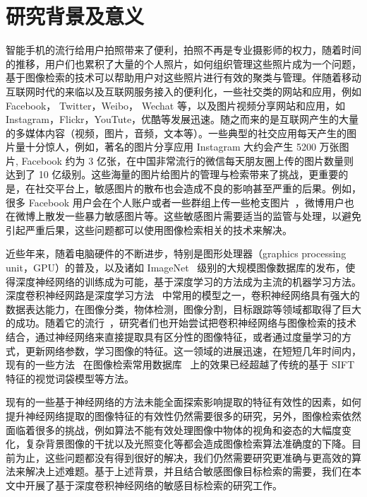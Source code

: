 \section{研究背景及意义}
智能手机的流行给用户拍照带来了便利，拍照不再是专业摄影师的权力，随着时间的推移，用户们也累积了大量的个人照片，如何组织管理这些照片成为一个问题，基于图像检索的技术可以帮助用户对这些照片进行有效的聚类与管理。伴随着移动互联网时代的来临以及互联网服务接入的便利化，一些社交类的网站和应用，例如 Facebook， Twitter，Weibo， Wechat 等，以及图片视频分享网站和应用，如 Instagram，Flickr，YouTute，优酷等发展迅速。随之而来的是互联网产生的大量的多媒体内容（视频，图片，音频，文本等）。一些典型的社交应用每天产生的图片量十分惊人，例如，著名的图片分享应用 Instagram 大约会产生 5200 万张图片, Facebook 约为 3 亿张，在中国非常流行的微信每天朋友圈上传的图片数量则达到了 10 亿级别。这些海量的图片给图片的管理与检索带来了挑战，更重要的是，在社交平台上，敏感图片的散布也会造成不良的影响甚至严重的后果。例如，很多 Facebook 用户会在个人账户或者一些群组上传一些枪支图片~\cite{Drange2016,MELE2016FacebookBG}，微博用户也在微博上散发一些暴力敏感图片等。这些敏感图片需要适当的监管与处理，以避免引起严重后果，这些问题都可以使用图像检索相关的技术来解决。

近些年来，随着电脑硬件的不断进步，特别是图形处理器（graphics processing unit，GPU）的普及，以及诸如 ImageNet~\cite{Russakovsky2015ImageNetLS} 级别的大规模图像数据库的发布，使得深度神经网络的训练成为可能，基于深度学习的方法成为主流的机器学习方法。深度卷积神经网路是深度学习方法~\cite{lecun2015deep} 中常用的模型之一，卷积神经网络具有强大的数据表达能力，在图像分类，物体检测，图像分割，目标跟踪等领域都取得了巨大的成功。随着它的流行~\cite{Krizhevsky2012ImageNetCW}，研究者们也开始尝试把卷积神经网络与图像检索的技术结合，通过神经网络来直接提取具有区分性的图像特征，或者通过度量学习的方式，更新网络参数，学习图像的特征。这一领域的进展迅速，在短短几年时间内，现有的一些方法~\cite{Gordo2016DeepIR} 在图像检索常用数据库~\cite{Philbin2007ObjectRW,Philbin2008LostIQ,Nistr2006ScalableRW,Jgou2008HammingEA} 上的效果已经超越了传统的基于 SIFT 特征的视觉词袋模型等方法。

现有的一些基于神经网络的方法未能全面探索影响提取的特征有效性的因素，如何提升神经网络提取的图像特征的有效性仍然需要很多的研究，另外，图像检索依然面临着很多的挑战，例如算法不能有效处理图像中物体的视角和姿态的大幅度变化，复杂背景图像的干扰以及光照变化等都会造成图像检索算法准确度的下降。目前为止，这些问题都没有得到很好的解决，我们仍然需要研究更准确与更高效的算法来解决上述难题。基于上述背景，并且结合敏感图像目标检索的需要，我们在本文中开展了基于深度卷积神经网络的敏感目标检索的研究工作。

